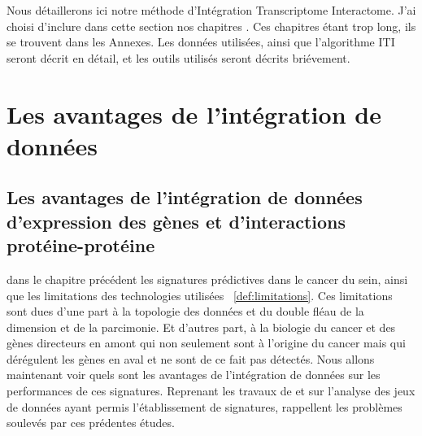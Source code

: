 \singlespacing

		\begin{center}
			\begin{tcolorbox}[colback=green!5!white,colframe=green!45!black,arc=0mm]
				\sffamily
				Nous détaillerons ici notre méthode d'Intégration Transcriptome Interactome. J'ai choisi d'inclure dans cette section nos chapitres \citep{Garcia2011,Garcia2013}. Ces chapitres étant trop long, ils se trouvent dans les Annexes. Les données utilisées, ainsi que l'algorithme ITI seront décrit en détail, et les outils utilisés seront décrits briévement.
			\end{tcolorbox}
			\vspace{5ex}
			\minitoc
		\end{center}
		\newpage

\doublespacing

	\section{\textcolor{green!45!black}{Les avantages de l'intégration de données}}

		\subsection{\textcolor{green!45!black}{Les avantages de l'intégration de données d'expression des gènes et d'interactions protéine-protéine}}
			 dans le chapitre précédent les signatures prédictives dans le cancer du sein, ainsi que les limitations des technologies utilisées ~\ref{def:limitations}.
			Ces limitations sont dues d'une part à la topologie des données et du double fléau de la dimension et de la parcimonie.
			Et d'autres part, à la biologie du cancer et des gènes directeurs en amont qui non seulement sont à l'origine du cancer mais qui dérégulent les gènes en aval et ne sont de ce fait pas détectés.
			Nous allons maintenant voir quels sont les avantages de l'intégration de données sur les performances de ces signatures.
			Reprenant les travaux de \citeauthor{vandevijver2002} et \citeauthor{Wang2005} sur l'analyse des jeux de données ayant permis l'établissement de signatures, \citeauthor{Chuang2007} rappellent les problèmes soulevés par ces prédentes études.

